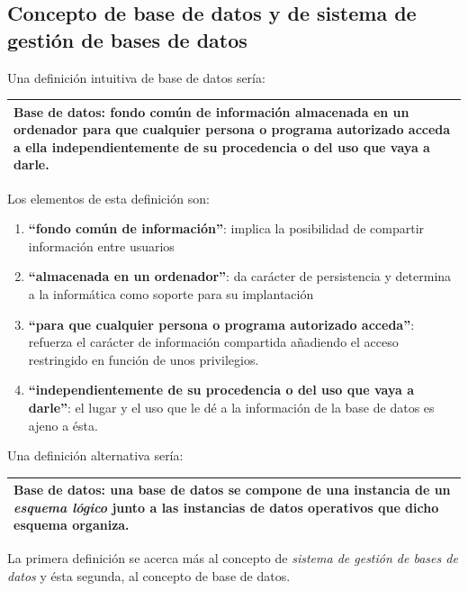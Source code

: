 \documentclass[10pt,a4paper,spanish]{report}
\begin{document}
\textcolor[rgb]{1,0.2,0.3}{\section{Concepto de base de datos y de sistema de gestión de bases de datos}}
Una definición intuitiva de base de datos sería:
\begin{center}
\begin{tabular}{|p{12cm}|}
\hline
\textbf{\textcolor[rgb]{1,0.2,0.3}{Base de datos}}: fondo común de información almacenada en un ordenador para que cualquier persona o programa autorizado acceda a ella independientemente de su procedencia o del uso que vaya a darle.\\
\hline
\end{tabular}
\end{center}

Los elementos de esta definición son:
\begin{enumerate}[$\heartsuit$]
    \item \textcolor[rgb]{1,0.2,0.3}{\textbf{``fondo común de información''}}: implica la posibilidad de compartir información entre usuarios
    \item \textcolor[rgb]{1,0.2,0.3}{\textbf{``almacenada en un ordenador''}}: da carácter de persistencia y determina a la informática como soporte para su implantación
    \item \textcolor[rgb]{1,0.2,0.3}{\textbf{``para que cualquier persona o programa autorizado acceda''}}: refuerza el carácter de información compartida añadiendo el acceso restringido en función de unos privilegios.
    \item \textcolor[rgb]{1,0.2,0.3}{\textbf{``independientemente de su procedencia o del uso que vaya a darle''}}: el lugar y el uso que le dé a la información de la base de datos es ajeno a ésta.
\end{enumerate}

Una definición alternativa sería:
\begin{center}
\begin{tabular}{|p{12cm}|}
\hline
\textcolor[rgb]{1,0.2,0.3}{\textbf{Base de datos}}: una base de datos se compone de una instancia de un \textcolor[rgb]{1,0.2,0.3}{\textit{esquema lógico}} junto a las instancias de datos operativos que dicho esquema organiza. \\
\hline
\end{tabular}
\end{center}

La primera definición se acerca más al concepto de \textit{\textcolor[rgb]{1,0.2,0.3}{sistema de gestión de bases de datos}} y ésta segunda, al concepto de base de datos.
\end{document}
